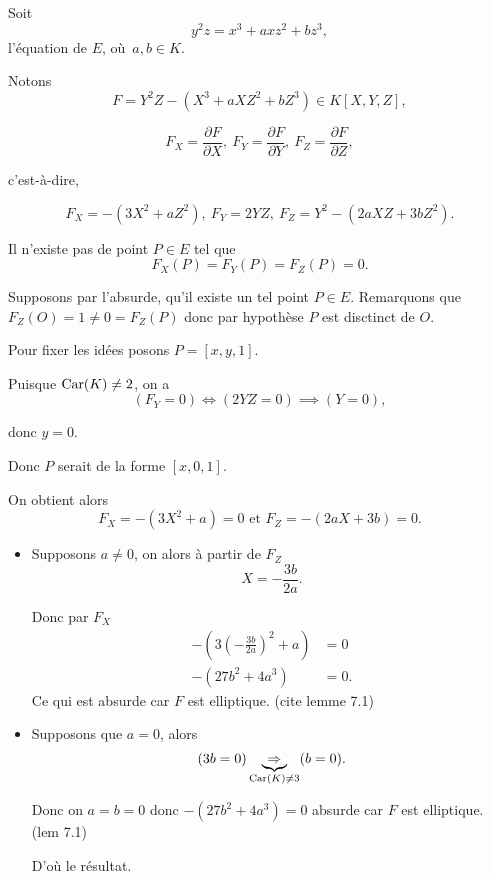 
Soit 
\[
y^2z = x^3 + axz^2 + bz^3
,\] l'équation de $E$, où $a,b \in K$.

Notons
\[
    F = Y^2Z - \left( X^3 + aXZ^2 + bZ^3 \right) \in K[X,Y,Z]
,\] 

\[
F_{X} = \frac{\partial F}{\partial X}, \ F_{Y} = \frac{\partial F}{\partial Y}, \ F_{Z} = \frac{\partial F}{\partial Z}
,\] 

c'est-à-dire, 

\[
F_{X} = - \left( 3X^2 + aZ^2 \right),  \ F_{Y} = 2YZ, \ F_{Z} = Y^2 - \left( 2aXZ + 3bZ^2 \right)
.\] 

\begin{lemme}
    Il n'existe pas de point $P \in E$ tel que
    \[
    F_{X}(P) = F_{Y}(P) = F_{Z}(P) = 0
    .\] 
\end{lemme}

\begin{demonstration}
   Supposons par l'absurde, qu'il existe un tel point $P \in E$. Remarquons que $F_{Z}(O) = 1 \neq 0 = F_{Z}(P)$ donc par hypothèse $P$ est disctinct de $O$.

   Pour fixer les idées posons $P = [x,y,1]$.

   Puisque $\operatorname{Car}(K) \neq 2$, on a
   \[
       (F_{Y} = 0) \iff (2YZ = 0) \implies (Y = 0) 
   ,\] 

   donc $y = 0$.
   
   Donc $P$ serait de la forme $[x,0,1]$.
   
   On obtient alors
   \[
   F_{X} = - \left( 3X^2 + a \right) = 0 \text{ et } F_{Z} = -\left( 2aX + 3b \right) = 0
   .\] 
   
   \begin{itemize}
       \item Supposons $a \neq 0$, on alors à partir de $F_{Z}$
   \[
       X = - \frac{3b}{2a} 
   .\] 

   Donc par $F_{X}$
\begin{align*}
    - \left( 3 (- \frac{3b}{2a})^2 + a \right) &= 0 \\
    - \left( 27b^2 + 4a^3 \right) &= 0
.\end{align*}
Ce qui est absurde car $F$ est elliptique. (cite lemme 7.1)
        \item Supposons que $a = 0$, alors
            \[
                (3b = 0) \underbrace{\Rightarrow}_{\operatorname{Car}(K) \neq 3} (b = 0)
            .\] 

            Donc on $a = b = 0$ donc $-\left( 27b^2 + 4a^3 \right) = 0$ absurde car $F$ est elliptique. (lem 7.1)

            D'où le résultat.
   \end{itemize}
\end{demonstration}
